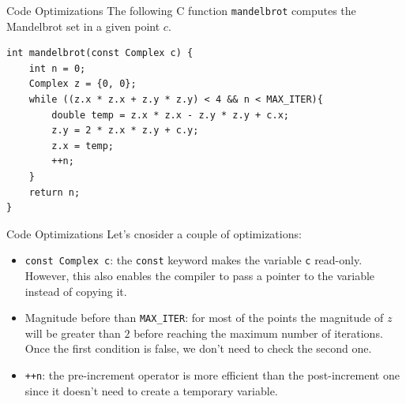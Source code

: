 %
%
\begin{frame}[fragile,t]{Code Optimizations}
    The following C function \texttt{mandelbrot} computes the Mandelbrot set
    in a given point $c$.
    \begin{lstlisting}[style=customc, basicstyle=\fontsize{8}{9}\selectfont\ttfamily]
int mandelbrot(const Complex c) {
    int n = 0;
    Complex z = {0, 0};
    while ((z.x * z.x + z.y * z.y) < 4 && n < MAX_ITER){
        double temp = z.x * z.x - z.y * z.y + c.x;
        z.y = 2 * z.x * z.y + c.y;
        z.x = temp;
        ++n;
    }
    return n;
}
    \end{lstlisting}
\end{frame}
\begin{frame}[fragile,t]{Code Optimizations}
    Let's cnosider a couple of optimizations:
    \begin{itemize}
        \item \texttt{const Complex c}: the \texttt{const} keyword
        makes the variable \texttt{c} read-only. However, this also
        enables the compiler to pass a pointer to the variable instead of
        copying it.
        \item Magnitude before than \texttt{MAX\_ITER}: for most of the
        points the magnitude of $z$ will be greater than $2$ before reaching
        the maximum number of iterations. Once the first condition is
        false, we don't need to check the second one.
        \item \texttt{++n}: the pre-increment operator is more efficient
        than the post-increment one since it doesn't need to create a temporary
        variable.
    \end{itemize}
\end{frame}

